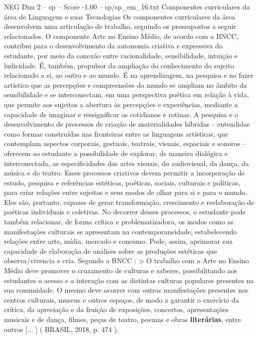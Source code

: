 \begin{textsample}{NEG Dim 2 – sp – Score -1.00 – sp/sp\_em\_16.txt}  \label{ex:f2_neg_081}
Componentes curriculares da área de Linguagens e suas Tecnologias Os componentes curriculares da área desenvolvem uma articulação de trabalho, seguindo os pressupostos a seguir relacionados.
O componente Arte no Ensino Médio, de acordo com a BNCC, contribui para o desenvolvimento da autonomia criativa e expressiva do estudante, por meio da conexão entre racionalidade, sensibilidade, intuição e ludicidade.
É, também, propulsor da ampliação do conhecimento do sujeito relacionado a si, ao outro e ao mundo.
É na aprendizagem, na pesquisa e no fazer artístico que as percepções e compreensões do mundo se ampliam no âmbito da sensibilidade e se interconectam, em uma perspectiva poética em relação à vida, que permite aos sujeitos a abertura às percepções e experiências, mediante a capacidade de imaginar e ressignificar os cotidianos e rotinas.
A pesquisa e o desenvolvimento de processos de criação de materialidades híbridas – entendidas como formas construídas nas fronteiras entre as linguagens artísticas, que contemplam aspectos corporais, gestuais, teatrais, visuais, espaciais e sonoros – oferecem ao estudante a possibilidade de explorar, de maneira dialógica e interconectada, as especificidades das artes visuais, do audiovisual, da dança, da música e do teatro.
Esses processos criativos devem permitir a incorporação de estudo, pesquisa e referências estéticas, poéticas, sociais, culturais e políticas, para criar relações entre sujeitos e seus modos de olhar para si e para o mundo.
Eles são, portanto, capazes de gerar transformação, crescimento e reelaboração de poéticas individuais e coletivas.
No decorrer desses processos, o estudante pode também relacionar, de forma crítica e problematizadora, os modos como as manifestações culturais se apresentam na contemporaneidade, estabelecendo relações entre arte, mídia, mercado e consumo.
Pode, assim, aprimorar sua capacidade de elaboração de análises sobre as produções estéticas que observa/vivencia e cria.
Segundo a BNCC : > O trabalho com a Arte no Ensino Médio deve promover o cruzamento de culturas e saberes, possibilitando aos estudantes o acesso e a interação com as distintas culturas populares presentes na sua comunidade.
O mesmo deve ocorrer com outras manifestações presentes nos centros culturais, museus e outros espaços, de modo a garantir o exercício da crítica, da apreciação e da fruição de exposições, concertos, apresentações musicais e de dança, filmes, peças de teatro, poemas e obras \textbf{literárias}, entre outros [... ] ( BRASIL, 2018, p. 474 ).

\end{textsample}
